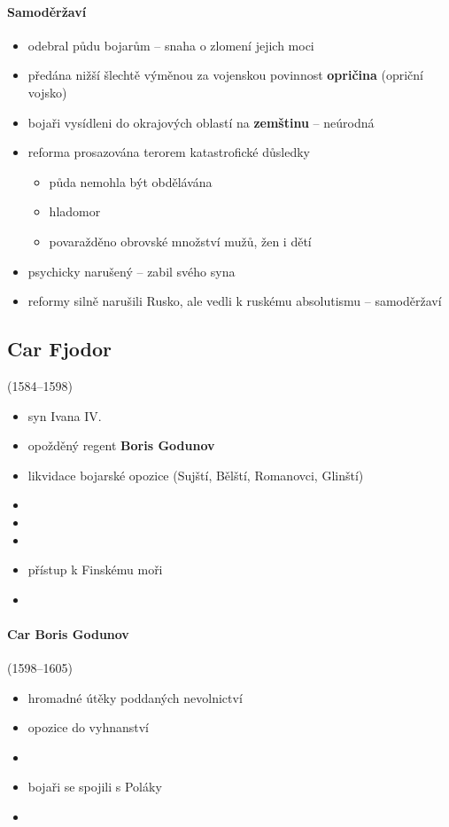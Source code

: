 \paragraph{Samoděržaví}
\begin{itemize}
\item odebral půdu bojarům -- snaha o zlomení jejich moci
\item předána nižší šlechtě výměnou za vojenskou povinnost \ra \textbf{opričina} (opriční vojsko)
\item bojaři vysídleni do okrajových oblastí na \textbf{zemštinu} -- neúrodná
\item reforma prosazována terorem \ra katastrofické důsledky
	\begin{itemize}
	\item půda nemohla být obdělávána
	\item hladomor
	\item povaražděno obrovské množství mužů, žen i dětí
	\end{itemize}
\item psychicky narušený -- zabil svého syna
\item reformy silně narušili Rusko, ale vedli k ruskému absolutismu -- samoděržaví
\end{itemize}

\subsection{Car Fjodor} (1584--1598)
\begin{itemize}
\item syn Ivana IV.
\item opožděný \ra regent \textbf{Boris Godunov}
\item likvidace bojarské opozice (Sujští, Bělští, Romanovci, Glinští)
\item {}
\item {}
\item {}
\item {}\ra přístup k Finskému moři
\item {} 
\end{itemize}

\paragraph{Car Boris Godunov}(1598--1605)
\begin{itemize}
\item hromadné útěky poddaných \ra nevolnictví
\item opozice do vyhnanství
\item {}
\item bojaři se spojili s Poláky
\item {}
\end{itemize}


